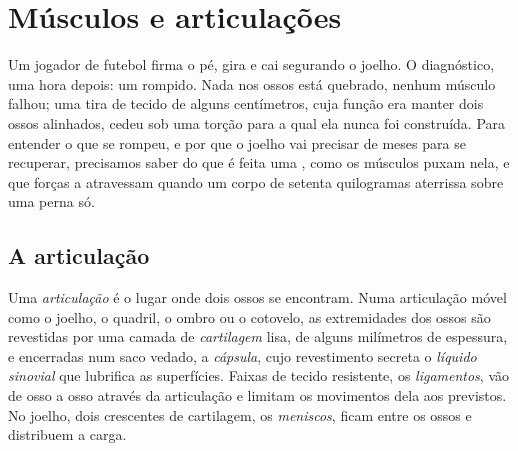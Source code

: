\chapter{Músculos e articulações}\label{ch:g10:muscles-and-joints}

Um jogador de futebol firma o pé, gira e cai segurando o joelho. O
diagnóstico, uma hora depois: um  rompido. Nada nos ossos está
quebrado, nenhum músculo falhou; uma tira de tecido de alguns
centímetros, cuja função era manter dois ossos alinhados, cedeu sob uma
torção para a qual ela nunca foi construída. Para entender o que se
rompeu, e por que o joelho vai precisar de meses para se recuperar,
precisamos saber do que é feita uma , como os músculos
puxam nela, e que forças a atravessam quando um corpo de setenta
quilogramas aterrissa sobre uma perna só.

\section{A articulação}

\begin{definition}[Articulação]\label{def:g10:muscles-and-joints:joint}
Uma \emph{articulação} é o lugar onde dois ossos se
encontram. Numa articulação móvel como o joelho, o quadril, o ombro ou
o cotovelo, as extremidades dos ossos são revestidas por uma camada de
\emph{cartilagem} lisa, de alguns milímetros de
espessura, e encerradas num saco vedado, a \emph{cápsula}, cujo
revestimento secreta o \emph{líquido sinovial} que lubrifica as
superfícies. Faixas de tecido resistente, os
\emph{ligamentos}, vão de osso a osso através da
articulação e limitam os movimentos dela aos previstos. No joelho, dois
crescentes de cartilagem, os \emph{meniscos}, ficam entre os ossos e
distribuem a carga.
\end{definition}

